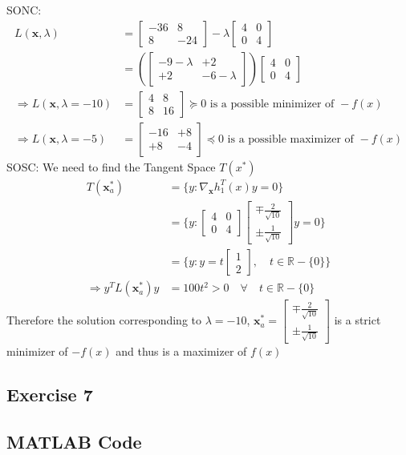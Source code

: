 \documentclass[11pt]{article}
\newcommand{\V}[1]{\pmb{#1}}
\newcommand{\mat}[1]{\begin{bmatrix}#1\end{bmatrix}}
\begin{document}
SONC:
\begin{align*}
 L(\V{x},\lambda) &=\mat{-36& 8\\8& -24} -\lambda\mat{4&0\\0&4}\\
 & = (\mat{-9-\lambda& +2\\+2& -6-\lambda})\mat{4&0\\0&4}\\
 \Rightarrow L(\V{x},\lambda=-10) &= \mat{4& 8\\8& 16} \succcurlyeq 0 \text{ is a possible minimizer of } -f(x)\\
 \Rightarrow L(\V{x},\lambda=-5) &= \mat{-16& +8\\+8& -4}\preccurlyeq 0 \text{ is a possible maximizer of } -f(x)
\end{align*}
SOSC: We need to find the Tangent Space $T(x^*)$
\begin{align*}
T(\V{x}^*_a) & = \{y: \nabla_{\V{x}}h_1^T(x)y = 0   \}\\
& = \{y: \mat{4&0\\0&4}\mat{\mp\frac{2}{\sqrt{10}} \\ \pm\frac{1}{\sqrt{10}}}y = 0   \}\\
&=\{y: y = t\mat{1\\2},\quad t\in\mathbb{R}-\{0\}\}\\
\Rightarrow y^TL(\V{x}^*_a)y &= 100t^2 > 0 \quad \forall \quad t\in\mathbb{R}-\{0\}
\end{align*}
Therefore the solution corresponding to $\lambda=-10$, $\V{x}^*_a =\mat{\mp\frac{2}{\sqrt{10}} \\ \pm\frac{1}{\sqrt{10}}}$ is a strict minimizer of $-f(x)$ and thus is a maximizer of $f(x)$

\clearpage
\vspace{2ex}
\subsection*{Exercise 7} 


\newpage
\subsection*{MATLAB Code}
%
\end{document}
